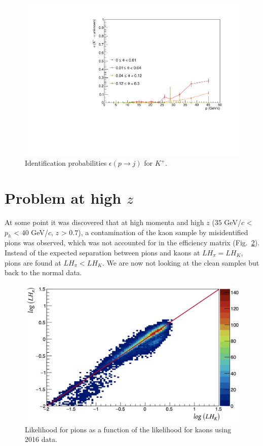 \begin{figure}[!p]
  \includegraphics[scale=0.35]{./gfx/Kp_u.pdf}
	\caption{Identification probabilities $\epsilon(p \rightarrow j)$ for $K^+$.}
	\label{pic:Effkp}
\end{figure}

\newpage

\section{Problem at high $z$}

At some point it was discovered that at high momenta and high $z$ ($35$ GeV/$c$ < $p_h$ < $40$ GeV/$c$, $z$ > $0.7$), a contamination of the kaon sample by misidentified pions was observed, which was not accounted for in the efficiency matrix (Fig.~\ref{pic:NonLin}). Instead of the expected separation between pions and kaons at $LH_{\pi} = LH_K$, pions are found at $LH_{\pi} < LH_K$. We are now not looking at the clean samples but back to the normal data.

\begin{figure}[!h]
  \centering
	\includegraphics[scale=0.35]{./gfx/RICHLH.png}
	\caption{Likelihood for pions as a function of the likelihood for kaons using 2016 data.}
	\label{pic:NonLin}
\end{figure}


